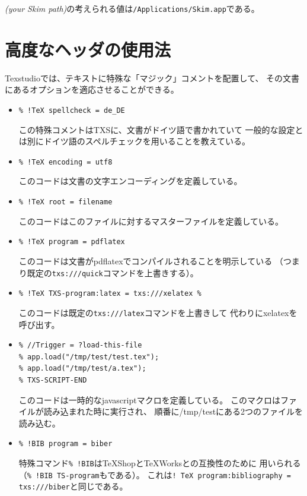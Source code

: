 \emph{(your Skim path)}の考えられる値は\verb+/Applications/Skim.app+である。

\section{高度なヘッダの使用法}\label{sec:magiccomment}

Texstudioでは、テキストに特殊な「マジック」コメントを配置して、
その文書にあるオプションを適応させることができる。

\begin{itemize}
\item
  \lstinline"% !TeX spellcheck = de_DE"

  この特殊コメントはTXSに、文書がドイツ語で書かれていて
  一般的な設定とは別にドイツ語のスペルチェックを用いることを教えている。
\item
  \lstinline"% !TeX encoding = utf8"

  このコードは文書の文字エンコーディングを定義している。
\item
  \lstinline"% !TeX root = filename"

  このコードはこのファイルに対するマスターファイルを定義している。
\item
  \lstinline"% !TeX program = pdflatex"

  このコードは文書がpdflatexでコンパイルされることを明示している
  （つまり既定の\verb+txs:///quick+コマンドを上書きする）。
\item
  \lstinline"% !TeX TXS-program:latex = txs:///xelatex %"

  このコードは既定の\verb+txs:///latex+コマンドを上書きして
  代わりにxelatexを呼び出す。
\item
\begin{lstlisting}[frame=single]
% !TeX TXS-SCRIPT = foobar
% //Trigger = ?load-this-file
% app.load("/tmp/test/test.tex");
% app.load("/tmp/test/a.tex");
% TXS-SCRIPT-END
\end{lstlisting}

  このコードは一時的なjavascriptマクロを定義している。
  このマクロはファイルが読み込まれた時に実行され、
  順番に/tmp/testにある2つのファイルを読み込む。
\item
  \lstinline"% !BIB program = biber"

  特殊コマンド\verb+% !BIB+はTeXShopとTeXWorksとの互換性のために
  用いられる（\verb+% !BIB TS-program+もである）。
  これは\verb+! TeX program:bibliography = txs:///biber+と同じである。

\end{itemize}


